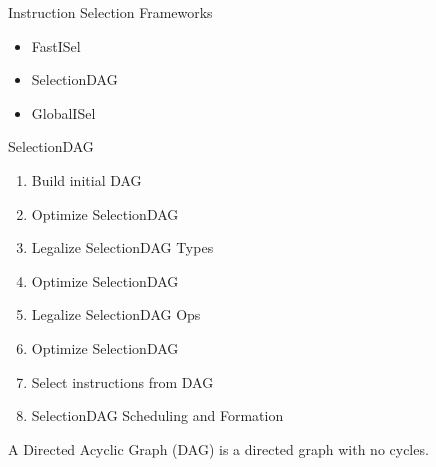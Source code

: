 \begin{frame}{Instruction Selection Frameworks}
    \begin{itemize}
        \item FastISel
        \item SelectionDAG
        \item GlobalISel
    \end{itemize}
\end{frame}

\begin{frame}{SelectionDAG}
    \begin{enumerate}
    \item 
    Build initial DAG
    \item
    Optimize SelectionDAG
    \item
    Legalize SelectionDAG Types 
    \item
    Optimize SelectionDAG 
    \item
    Legalize SelectionDAG Ops 
    \item
    Optimize SelectionDAG
    \item
    Select instructions from DAG
    \item
    SelectionDAG Scheduling and Formation
    \end{enumerate}

	\begin{definition}
		A \alert{Directed Acyclic Graph (DAG)} is a directed graph with no cycles.
	\end{definition}
\end{frame}
